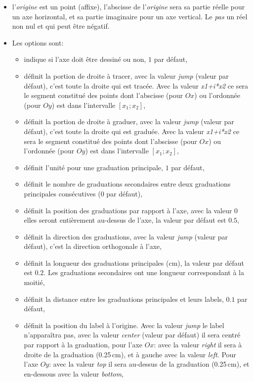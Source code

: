 \begin{itemize}
 \item\desc l'\emph{origine} est un point (affixe), l'abscisse de l'\emph{origine} sera sa partie réelle pour un axe horizontal, et sa partie imaginaire pour un axe vertical. Le \emph{pas} un réel non nul et qui peut être négatif.
 \item Les options sont:
  \begin{itemize}
  \item {} indique si l'axe doit être dessiné ou non, $1$ par défaut,
  \item {} définit la portion de droite à tracer, avec la valeur \emph{jump} (valeur par défaut), c'est toute la droite qui est tracée. Avec la valeur \emph{x1+i*x2} ce sera le segment constitué des points dont l'abscisse (pour $Ox$) ou l'ordonnée (pour $Oy$) est dans l'intervalle $[x_1;x_2]$,
  \item {} définit la portion de droite à graduer, avec la valeur \emph{jump} (valeur par défaut), c'est toute la droite qui est graduée. Avec la valeur \emph{x1+i*x2} ce sera le segment constitué des points dont l'abscisse (pour $Ox$) ou l'ordonnée (pour $Oy$) est dans l'intervalle $[x_1;x_2]$,
  \item {} définit l'unité pour une graduation principale, $1$ par défaut,
  \item {} définit le nombre de graduations secondaires entre deux graduations principales consécutives (0 par défaut),
  \item {} définit la position des graduations par rapport à l'axe, avec la valeur $0$ elles seront entièrement au-dessus de l'axe, la valeur par défaut est $0.5$,
  \item {} définit la direction des graduations, avec la valeur \emph{jump} (valeur par défaut), c'est la direction orthogonale à l'axe,
  \item {} définit la longueur des graduations principales (cm), la valeur par défaut est $0.2$. Les graduations secondaires ont une longueur correspondant à la moitié,
  \item {} définit la distance entre les graduations principales et leurs labels, $0.1$ par défaut,
  \item {} définit la position du label à l'origine. Avec la valeur \emph{jump} le label n'apparaîtra pas, avec la valeur \emph{center} (valeur par défaut) il sera centré par rapport à la graduation, pour l'axe $Ox$: avec la valeur \emph{right} il sera à droite de la graduation (0.25\,cm), et à gauche avec la valeur \emph{left}. Pour l'axe $Oy$: avec la valeur \emph{top} il sera au-dessus de la graduation (0.25\,cm), et en-dessous avec la valeur \emph{bottom},

\end{itemize}
\end{itemize}
